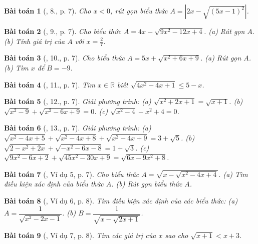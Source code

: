 \documentclass{article}
\newtheorem{baitoan}{Bài toán}
\begin{document}
\begin{baitoan}[\cite{Tuyen_Toan_9}, 8., p. 7]
	Cho $x < 0$, rút gọn biểu thức $A = |2x - \sqrt{(5x - 1)^2}|$.
\end{baitoan}

\begin{baitoan}[\cite{Tuyen_Toan_9}, 9., p. 7]
	Cho biểu thức $A = 4x - \sqrt{9x^2 - 12x + 4}$. (a) Rút gọn $A$. (b) Tính giá trị của $A$ với $x = \frac{2}{7}$.
\end{baitoan}

\begin{baitoan}[\cite{Tuyen_Toan_9}, 10., p. 7]
	Cho biểu thức $A = 5x + \sqrt{x^2 + 6x + 9}$. (a) Rút gọn $A$. (b) Tìm $x$ để $B = -9$.
\end{baitoan}

\begin{baitoan}[\cite{Tuyen_Toan_9}, 11., p. 7]
	Tìm $x\in\mathbb{R}$ biết $\sqrt{4x^2 - 4x + 1}\le5 - x$.
\end{baitoan}

\begin{baitoan}[\cite{Tuyen_Toan_9}, 12., p. 7]
	Giải phương trình: (a) $\sqrt{x^2 + 2x + 1} = \sqrt{x + 1}$. (b) $\sqrt{x^2 - 9} + \sqrt{x^2 - 6x + 9} = 0$. (c) $\sqrt{x^2 - 4} - x^2 + 4 = 0$.
\end{baitoan}

\begin{baitoan}[\cite{Tuyen_Toan_9}, 13., p. 7]
	Giải phương trình: (a) $\sqrt{x^2 - 4x + 5} + \sqrt{x^2 - 4x + 8} + \sqrt{x^2 - 4x + 9} = 3 + \sqrt{5}$. (b) $\sqrt{2 - x^2 + 2x} + \sqrt{-x^2 - 6x - 8} = 1 + \sqrt{3}$. (c) $\sqrt{9x^2 - 6x + 2} + \sqrt{45x^2 - 30x + 9} = \sqrt{6x - 9x^2 + 8}$. 
\end{baitoan}

\begin{baitoan}[\cite{Binh_Toan_9_tap_1}, Ví dụ 5, p. 7]
	Cho biểu thức $A = \sqrt{x - \sqrt{x^2 - 4x + 4}}$. (a) Tìm điều kiện xác định của biểu thức $A$. (b) Rút gọn biểu thức $A$.
\end{baitoan}

\begin{baitoan}[\cite{Binh_Toan_9_tap_1}, Ví dụ 6, p. 8]
	Tìm điều kiện xác định của các biểu thức: (a) $A = \dfrac{1}{\sqrt{x^2 - 2x - 1}}$. (b) $B = \dfrac{1}{\sqrt{x - \sqrt{2x + 1}}}$.
\end{baitoan}

\begin{baitoan}[\cite{Binh_Toan_9_tap_1}, Ví dụ 7, p. 8]
	Tìm các giá trị của $x$ sao cho $\sqrt{x + 1} < x + 3$.
\end{baitoan}
\end{document}

